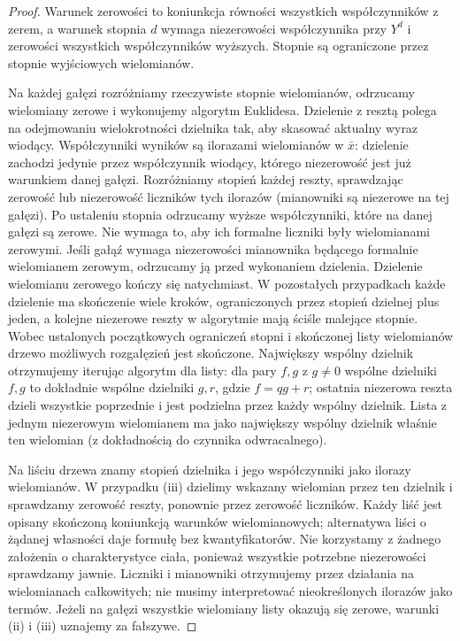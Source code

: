 \begin{proof}
Warunek zerowości to koniunkcja równości wszystkich
współczynników z zerem, a warunek stopnia $d$ wymaga
niezerowości współczynnika przy $Y^d$ i zerowości
wszystkich współczynników wyższych. Stopnie są
ograniczone przez stopnie wyjściowych wielomianów.

Na każdej gałęzi rozróżniamy rzeczywiste stopnie
wielomianów, odrzucamy wielomiany zerowe i wykonujemy
algorytm Euklidesa. Dzielenie z resztą polega na
odejmowaniu wielokrotności dzielnika tak, aby
skasować aktualny wyraz wiodący. Współczynniki
wyników są ilorazami wielomianów w $\bar x$:
dzielenie zachodzi jedynie przez współczynnik wiodący,
którego niezerowość jest już warunkiem danej gałęzi.
Rozróżniamy stopień każdej reszty, sprawdzając
zerowość lub niezerowość liczników tych ilorazów
(mianowniki są niezerowe na tej gałęzi).
Po ustaleniu stopnia odrzucamy wyższe współczynniki,
które na danej gałęzi są zerowe. Nie wymaga to,
aby ich formalne liczniki były wielomianami zerowymi.
Jeśli gałąź wymaga niezerowości mianownika będącego
formalnie wielomianem zerowym, odrzucamy ją przed
wykonaniem dzielenia.
Dzielenie wielomianu zerowego kończy się natychmiast.
W pozostałych przypadkach każde dzielenie ma skończenie
wiele kroków, ograniczonych przez stopień dzielnej plus jeden, a kolejne niezerowe
reszty w algorytmie mają ściśle malejące stopnie.
Wobec ustalonych początkowych ograniczeń stopni i
skończonej listy wielomianów drzewo możliwych rozgałęzień
jest skończone. Największy wspólny dzielnik otrzymujemy
iterując algorytm dla listy: dla pary $f,g$ z $g\ne0$
wspólne dzielniki $f,g$ to dokładnie wspólne dzielniki
$g,r$, gdzie $f=qg+r$; ostatnia niezerowa reszta dzieli
wszystkie poprzednie i jest podzielna przez każdy
wspólny dzielnik. Lista z jednym niezerowym wielomianem ma jako
największy wspólny dzielnik właśnie ten wielomian
(z dokładnością do czynnika odwracalnego).

Na liściu drzewa znamy stopień dzielnika i jego
współczynniki jako ilorazy wielomianów. W przypadku (iii)
dzielimy wskazany wielomian przez ten dzielnik
i sprawdzamy zerowość reszty, ponownie przez
zerowość liczników. Każdy liść jest opisany skończoną
koniunkcją warunków wielomianowych; alternatywa
liści o żądanej własności daje formułę bez kwantyfikatorów.
Nie korzystamy z żadnego założenia o charakterystyce
ciała, ponieważ wszystkie potrzebne niezerowości
sprawdzamy jawnie. Liczniki i mianowniki otrzymujemy
przez działania na wielomianach całkowitych; nie musimy
interpretować nieokreślonych ilorazów jako termów.
Jeżeli na gałęzi wszystkie wielomiany listy okazują
się zerowe, warunki (ii) i (iii) uznajemy za fałszywe.
\end{proof}


